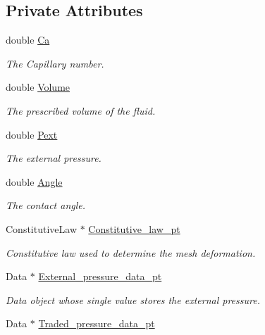 \subsection*{Private Attributes}
\begin{DoxyCompactItemize}
\item 
double \hyperlink{classPseudoSolidCapProblem_ad29a43062d88106c495d407abeddd88d}{Ca}
\begin{DoxyCompactList}\small\item\em The Capillary number. \end{DoxyCompactList}\item 
double \hyperlink{classPseudoSolidCapProblem_a49945d8e5740977a72c63e333a65293f}{Volume}
\begin{DoxyCompactList}\small\item\em The prescribed volume of the fluid. \end{DoxyCompactList}\item 
double \hyperlink{classPseudoSolidCapProblem_afbcfe3a5a05d191c44815681e4b621d0}{Pext}
\begin{DoxyCompactList}\small\item\em The external pressure. \end{DoxyCompactList}\item 
double \hyperlink{classPseudoSolidCapProblem_a51dfbd14a2cca78dc0efe6740337a22b}{Angle}
\begin{DoxyCompactList}\small\item\em The contact angle. \end{DoxyCompactList}\item 
Constitutive\+Law $\ast$ \hyperlink{classPseudoSolidCapProblem_ab9d26ab5daa295e7ac4cdca1802ec156}{Constitutive\+\_\+law\+\_\+pt}
\begin{DoxyCompactList}\small\item\em Constitutive law used to determine the mesh deformation. \end{DoxyCompactList}\item 
Data $\ast$ \hyperlink{classPseudoSolidCapProblem_a51ac066b9117f30679fef658ff66d981}{External\+\_\+pressure\+\_\+data\+\_\+pt}
\begin{DoxyCompactList}\small\item\em Data object whose single value stores the external pressure. \end{DoxyCompactList}\item 
Data $\ast$ \hyperlink{classPseudoSolidCapProblem_a073f0857df471e2f165d57828511d835}{Traded\+\_\+pressure\+\_\+data\+\_\+pt}

\end{DoxyCompactItemize}
